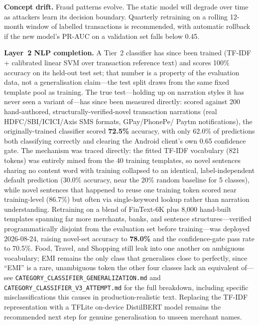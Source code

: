\documentclass[conference]{IEEEtran}
\begin{document}
\textbf{Concept drift.} Fraud patterns evolve. The static model will
degrade over time as attackers learn its decision boundary. Quarterly
retraining on a rolling 12-month window of labelled transactions is
recommended, with automatic rollback if the new model's PR-AUC on a
validation set falls below 0.45.

\textbf{Layer~2 NLP completion.} A Tier~2 classifier has since been trained
(TF-IDF + calibrated linear SVM over transaction reference text) and scores
100\% accuracy on its held-out test set; that number is a property of the
evaluation data, not a generalisation claim---the test split draws from the
same fixed template pool as training. The true test---holding up on
narration styles it has never seen a variant of---has since been measured
directly: scored against 200 hand-authored, structurally-verified-novel
transaction narrations (real HDFC/SBI/ICICI/Axis SMS formats, GPay/PhonePe/
Paytm notifications), the originally-trained classifier scored \textbf{72.5\%}
accuracy, with only 62.0\% of predictions both classifying correctly and
clearing the Android client's own 0.65 confidence gate. The mechanism was
traced directly: the fitted TF-IDF vocabulary (821 tokens) was entirely mined
from the 40 training templates, so novel sentences sharing no content word
with training collapsed to an identical, label-independent default prediction
(30.0\% accuracy, near the 20\% random baseline for 5 classes), while novel
sentences that happened to reuse one training token scored near
training-level (86.7\%) but often via single-keyword lookup rather than
narration understanding. Retraining on a blend of FinText-6K plus 8,000
hand-built templates spanning far more merchants, banks, and sentence
structures---verified programmatically disjoint from the evaluation set
before training---was deployed 2026-08-24, raising novel-set accuracy to
\textbf{78.0\%} and the confidence-gate pass rate to 70.5\%. Food, Travel,
and Shopping still leak into one another on ambiguous vocabulary; EMI
remains the only class that generalises close to perfectly, since ``EMI''
is a rare, unambiguous token the other four classes lack an equivalent
of---see \texttt{CATEGORY\_CLASSIFIER\_GENERALIZATION.md} and
\texttt{CATEGORY\_CLASSIFIER\_V3\_ATTEMPT.md} for the full breakdown,
including specific misclassifications this causes in production-realistic
text. Replacing the TF-IDF representation with a TFLite on-device
DistilBERT model remains the recommended next step for genuine
generalisation to unseen merchant names.
\end{document}
